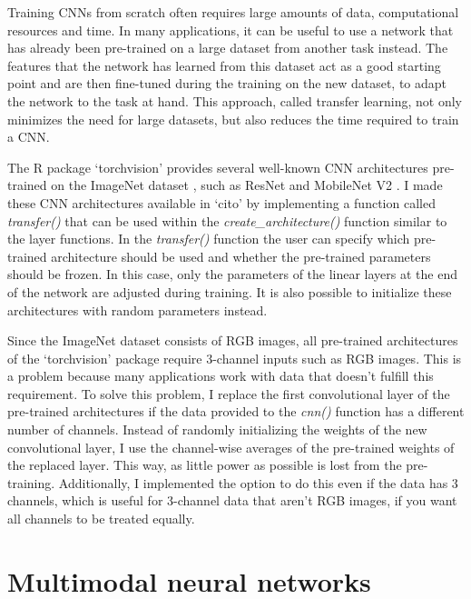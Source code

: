 \documentclass[12pt,twoside]{scrreport}
\newcommand{\pkg}[1]{`#1'}
\newcommand{\fn}[2][]{\textit{#2(}#1\textit{)}}
\begin{document}
Training CNNs from scratch often requires large amounts of data, computational resources and time. In many applications, it can be useful to use a network that has already been pre-trained on a large dataset from another task instead. The features that the network has learned from this dataset act as a good starting point and are then fine-tuned during the training on the new dataset, to adapt the network to the task at hand. This approach, called transfer learning, not only minimizes the need for large datasets, but also reduces the time required to train a CNN.

The R package \pkg{torchvision} \citep{falbelTorchvisionModelsDatasets2024} provides several well-known CNN architectures pre-trained on the ImageNet dataset \citep{deng2009imagenet}, such as ResNet \citep{heDeepResidualLearning2015} and MobileNet V2 \citep{sandlerMobileNetV2InvertedResiduals2019}. I made these CNN architectures available in \pkg{cito} by implementing a function called \fn{transfer} that can be used within the \fn{create\_architecture} function similar to the layer functions. In the \fn{transfer} function the user can specify which pre-trained architecture should be used and whether the pre-trained parameters should be frozen. In this case, only the parameters of the linear layers at the end of the network are adjusted during training. It is also possible to initialize these architectures with random parameters instead.

Since the ImageNet dataset consists of RGB images, all pre-trained architectures of the \pkg{torchvision} package require 3-channel inputs such as RGB images. This is a problem because many applications work with data that doesn't fulfill this requirement. To solve this problem, I replace the first convolutional layer of the pre-trained architectures if the data provided to the \fn{cnn} function has a different number of channels. Instead of randomly initializing the weights of the new convolutional layer, I use the channel-wise averages of the pre-trained weights of the replaced layer. This way, as little power as possible is lost from the pre-training. Additionally, I implemented the option to do this even if the data has 3 channels, which is useful for 3-channel data that aren't RGB images, if you want all channels to be treated equally.

\section*{Multimodal neural networks}
\end{document}

